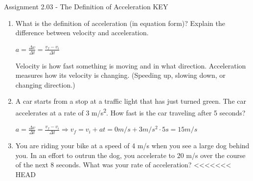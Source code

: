 \documentclass[letterpaper, 12pt]{article}
\begin{document}


\begin{center} Assignment 2.03 - The Definition of Acceleration KEY
\end{center}





\begin{enumerate}
\item What is the definition of acceleration (in equation form)?  Explain the difference between velocity and acceleration.  

	\color{red}
	\begin{center} $ a = \frac{\Delta v}{\Delta t } = \frac{v_f - v_i}{\Delta t}$
		\vspace{0.15in}
		
			Velocity is how fast something is moving and in what direction.  Acceleration measures how its velocity is changing. (Speeding up, slowing down, or changing direction.)
		
	\end{center}
	
	
	\color{black}
	\vspace{0.15in}


\item A car starts from a stop at a traffic light that has just turned green.  The car accelerates at a rate of 3 m/s\textsuperscript{2}.  How fast is the car traveling after 5 seconds?

	
	\color{red}
	\begin{center} $ a = \frac{\Delta v}{\Delta t } = \frac{v_f - v_i}{\Delta t} \Longrightarrow v_f = v_i + a t =  0 m/s + 3 m/s^2 \cdot 5s = 15 m/s $
		\vspace{0.15in}
		
	
	\end{center}
	
	
	\color{black}







\item You are riding your bike at a speed of 4 m/s when you see a large dog behind you.  In an effort to outrun the dog, you accelerate to 20 m/s over the course of the next 8 seconds.  What was your rate of acceleration?
<<<<<<< HEAD


\end{enumerate}
\end{document}
